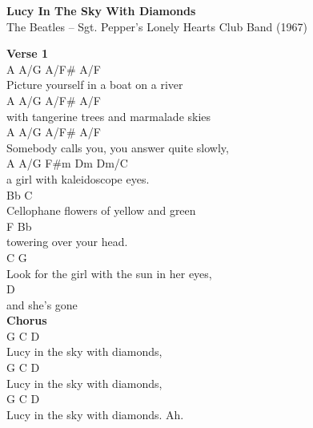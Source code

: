 \documentclass[a4paper]{article}
\begin{document}
    \begin{center}
        \textbf{Lucy In The Sky With Diamonds}
        ~\\
        The Beatles -- Sgt. Pepper's Lonely Hearts Club Band (1967)
    \end{center}
    {
        \scriptsize
        \textbf{Verse 1}
        ~\\
        {
            \cutive
            \obeyspaces
A           A/G       A/F\#      A/F
\\
Picture yourself in a boat on a river
\\
     A         A/G       A/F\#      A/F
\\
with tangerine trees and marmalade skies
\\
A              A/G      A/F\#         A/F
\\
Somebody calls you, you answer quite slowly,
\\
  A            A/G       F\#m      Dm    Dm/C
\\
a girl with kaleidoscope eyes.
\\
Bb                    C
\\
Cellophane flowers of yellow and green
\\
F                  Bb
\\
towering over your head.
\\
C                          G
\\
Look for the girl with the sun in her eyes,
\\
          D
\\
and she's gone
\\

        }
        \textbf{Chorus}
        ~\\
        {
            \cutive
            \obeyspaces
G           C        D
\\
Lucy in the sky with diamonds,
\\
G           C        D
\\
Lucy in the sky with diamonds,
\\
G           C        D
\\
Lucy in the sky with diamonds. Ah.
\\

}}
\end{document}
